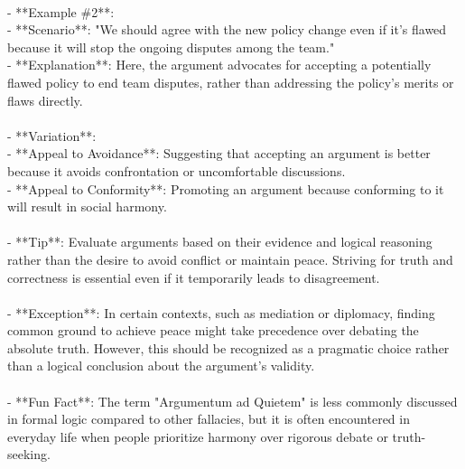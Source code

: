 \documentclass[a4paper,12pt,single,pdftex]{scrbook}
\begin{document}
    \\

    
      - **Example \#2**:
    \\

    
        - **Scenario**: "We should agree with the new policy change even if it's flawed because it will stop the ongoing disputes among the team."
    \\

    
        - **Explanation**: Here, the argument advocates for accepting a potentially flawed policy to end team disputes, rather than addressing the policy's merits or flaws directly.
    \\

    
      
    \\

    
      - **Variation**:
    \\

    
        - **Appeal to Avoidance**: Suggesting that accepting an argument is better because it avoids confrontation or uncomfortable discussions.
    \\

    
        - **Appeal to Conformity**: Promoting an argument because conforming to it will result in social harmony.
    \\

    
      
    \\

    
      - **Tip**: Evaluate arguments based on their evidence and logical reasoning rather than the desire to avoid conflict or maintain peace. Striving for truth and correctness is essential even if it temporarily leads to disagreement.
    \\

    
      
    \\

    
      - **Exception**: In certain contexts, such as mediation or diplomacy, finding common ground to achieve peace might take precedence over debating the absolute truth. However, this should be recognized as a pragmatic choice rather than a logical conclusion about the argument's validity.
    \\

    
      
    \\

    
      - **Fun Fact**: The term "Argumentum ad Quietem" is less commonly discussed in formal logic compared to other fallacies, but it is often encountered in everyday life when people prioritize harmony over rigorous debate or truth-seeking.
    \\
\end{document}

